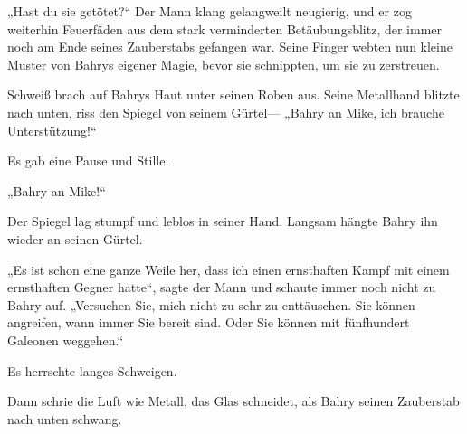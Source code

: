 „Hast du sie getötet?“ Der Mann klang gelangweilt neugierig, und er zog weiterhin Feuerfäden aus dem stark verminderten Betäubungsblitz, der immer noch am Ende seines Zauberstabs gefangen war. Seine Finger webten nun kleine Muster von Bahrys eigener Magie, bevor sie schnippten, um sie zu zerstreuen.

Schweiß brach auf Bahrys Haut unter seinen Roben aus. Seine Metallhand blitzte nach unten, riss den Spiegel von seinem Gürtel— „Bahry an Mike, ich brauche Unterstützung!“

Es gab eine Pause und Stille.

„Bahry an Mike!“

Der Spiegel lag stumpf und leblos in seiner Hand. Langsam hängte Bahry ihn wieder an seinen Gürtel.

„Es ist schon eine ganze Weile her, dass ich einen ernsthaften Kampf mit einem ernsthaften Gegner hatte“, sagte der Mann und schaute immer noch nicht zu Bahry auf. „Versuchen Sie, mich nicht zu sehr zu enttäuschen. Sie können angreifen, wann immer Sie bereit sind. Oder Sie können mit fünfhundert Galeonen weggehen.“

Es herrschte langes Schweigen.

Dann schrie die Luft wie Metall, das Glas schneidet, als Bahry seinen Zauberstab nach unten schwang.

\later

